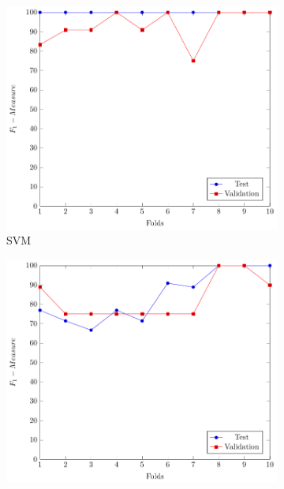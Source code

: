 \begin{figure}[htb]
	\centering
	\begin{subfigure}[b]{0.48\textwidth}
		\centering
		\includegraphics[width=\textwidth]{img/prai/svm_test_validation/svm_test_validation}
		\caption[Network2]%
		{{\small SVM}}    
		\label{fig:svm_val_test}
	\end{subfigure}
	\hfill
	\begin{subfigure}[b]{0.48\textwidth}  
		\centering 
		\includegraphics[width=\textwidth]{img/prai/svm_unbalanced_test_validation/svm_unbalanced_test_validation}

\end{subfigure}
\end{figure}

